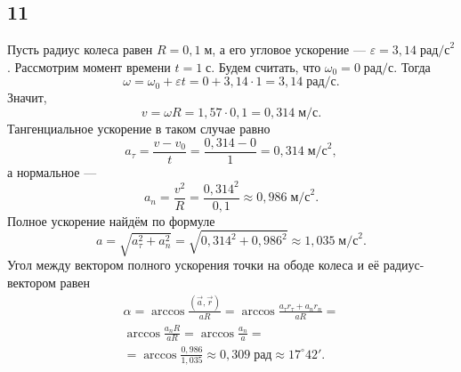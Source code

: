 \subsection{11}

Пусть радиус колеса равен $R=0{,}1\;\text{м}$, а его угловое ускорение --- $\varepsilon=3{,}14\;\text{рад/с}^2$. Рассмотрим момент времени $t=1\;\text{с}$. Будем считать, что $\omega_0=0\;\text{рад/с}$. Тогда
\[
\omega=\omega_0+\varepsilon t=0+3{,}14\cdot1=3{,}14\;\text{рад/с}.
\]
Значит,
\[
v=\omega R=1{,}57\cdot0{,}1=0{,}314\;\text{м/с}.
\]
Тангенциальное ускорение в таком случае равно
\[
a_\tau=\frac{v-v_0}{t}=\frac{0{,}314-0}{1}=0{,}314\;\text{м/с}^2,
\]
а нормальное ---
\[
a_n=\frac{v^2}{R}=\frac{0{,}314^2}{0{,}1}\approx0{,}986\;\text{м/с}^2.
\]
Полное ускорение найдём по формуле
\[
a=\sqrt{a_\tau^2+a_n^2}=\sqrt{0{,}314^2+0{,}986^2}\approx1{,}035\;\text{м/с}^2.
\]
Угол между вектором полного ускорения точки на ободе колеса и её радиус-вектором равен
\begin{multline*}
\alpha=\arccos\frac{(\vec a,\vec r)}{aR}=\arccos\frac{a_\tau r_\tau+a_nr_n}{aR}= \\
\arccos\frac{a_nR}{aR}=\arccos\frac{a_n}{a}= \\
=\arccos\frac{0{,}986}{1{,}035}\approx0{,}309\;\text{рад}\approx17^\circ42'.
\end{multline*}